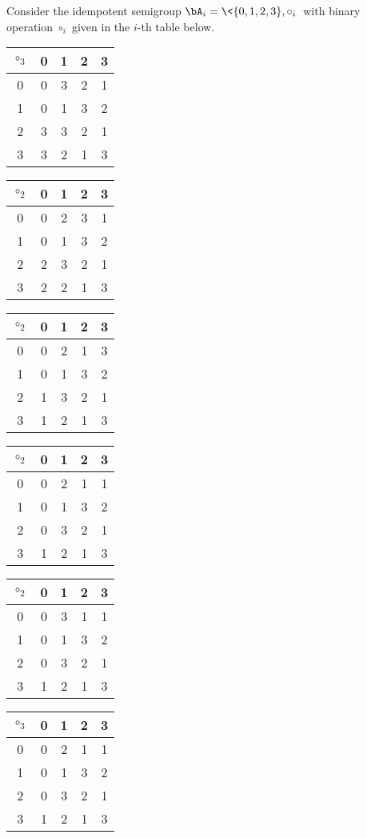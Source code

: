 \begin{example}
  \label{four-elt-grpd}
Consider the idempotent semigroup 
$\bA_i = \<\{0,1,2,3\}, \circ_i\>$ with binary operation $\circ_i$ given in the $i$-th table below.
\vskip3mm
 \begin{center}
 \begin{tabular}{c|cccc}
      $\circ_3$ & 0 & 1 & 2 & 3\\
      \hline
           0    & 0 & 3 & 2 & 1\\
           1    & 0 & 1 & 3 & 2\\
           2    & 3 & 3 & 2 & 1\\
           3    & 3 & 2 & 1 & 3
    \end{tabular}\hskip1cm
 \begin{tabular}{c|cccc}
      $\circ_2$ & 0 & 1 & 2 & 3\\
      \hline
           0    & 0 & 2 & 3 & 1\\
           1    & 0 & 1 & 3 & 2\\
           2    & 2 & 3 & 2 & 1\\
           3    & 2 & 2 & 1 & 3
    \end{tabular}\hskip1cm
 \begin{tabular}{c|cccc}
      $\circ_2$ & 0 & 1 & 2 & 3\\
      \hline
           0    & 0 & 2 & 1 & 3\\
           1    & 0 & 1 & 3 & 2\\
           2    & 1 & 3 & 2 & 1\\
           3    & 1 & 2 & 1 & 3
    \end{tabular}
 \end{center}
 \vskip5mm
 \begin{center}
 \begin{tabular}{c|cccc}
      $\circ_2$ & 0 & 1 & 2 & 3\\
      \hline
           0    & 0 & 2 & 1 & 1\\
           1    & 0 & 1 & 3 & 2\\
           2    & 0 & 3 & 2 & 1\\
           3    & 1 & 2 & 1 & 3
    \end{tabular}\hskip1cm
 \begin{tabular}{c|cccc}
      $\circ_2$ & 0 & 1 & 2 & 3\\
      \hline
           0    & 0 & 3 & 1 & 1\\
           1    & 0 & 1 & 3 & 2\\
           2    & 0 & 3 & 2 & 1\\
           3    & 1 & 2 & 1 & 3
    \end{tabular}\hskip1cm
 \begin{tabular}{c|cccc}
      $\circ_3$ & 0 & 1 & 2 & 3\\
      \hline
           0    & 0 & 2 & 1 & 1\\
           1    & 0 & 1 & 3 & 2\\
           2    & 0 & 3 & 2 & 1\\
           3    & 1 & 2 & 1 & 3
    \end{tabular}
 \end{center}
\end{example}




 


